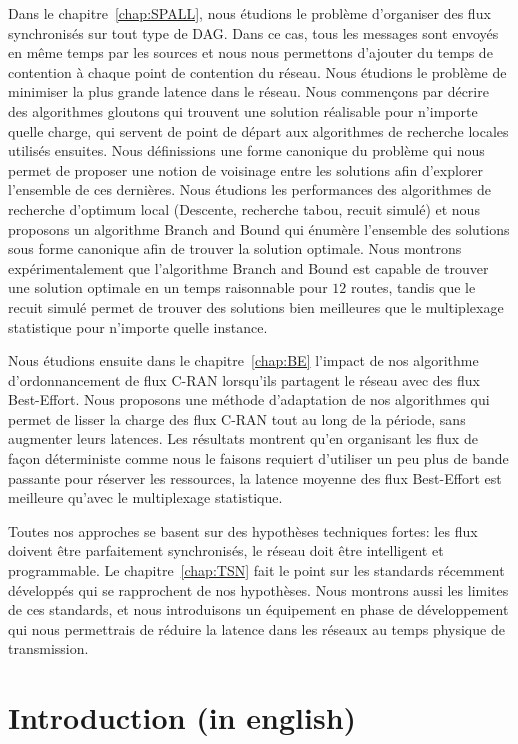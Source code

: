 Dans le chapitre~\ref{chap:SPALL}, nous étudions le problème d'organiser des flux synchronisés sur tout type de DAG. Dans ce cas, tous les messages sont envoyés en même temps par les sources et nous nous permettons d'ajouter du temps de contention à chaque point de contention du réseau. Nous étudions le problème de minimiser la plus grande latence dans le réseau. Nous commençons par décrire des algorithmes gloutons qui trouvent une solution réalisable pour n'importe quelle charge, qui servent de point de départ aux algorithmes de recherche locales utilisés ensuites. Nous définissions une forme canonique du problème qui nous permet de proposer une notion de voisinage entre les solutions afin d'explorer l'ensemble de ces dernières. Nous étudions les performances des algorithmes de recherche d'optimum local (Descente, recherche tabou, recuit simulé) et nous proposons un algorithme Branch and Bound qui énumère l'ensemble des solutions sous forme canonique afin de trouver la solution optimale. Nous montrons expérimentalement que l'algorithme Branch and Bound est capable de trouver une solution optimale en un temps raisonnable pour $12$ routes, tandis que le recuit simulé permet de trouver des solutions bien meilleures que le multiplexage statistique pour n'importe quelle instance.

Nous étudions ensuite dans le chapitre~\ref{chap:BE} l'impact de nos algorithme d'ordonnancement de flux C-RAN lorsqu'ils partagent le réseau avec des flux Best-Effort. Nous proposons une méthode d'adaptation de nos algorithmes qui permet de lisser la charge des flux C-RAN tout au long de la période, sans augmenter leurs latences. Les résultats montrent qu'en organisant les flux de façon déterministe comme nous le faisons requiert d'utiliser un peu plus de bande passante pour réserver les ressources, la latence moyenne des flux Best-Effort est meilleure qu'avec le multiplexage statistique.

Toutes nos approches se basent sur des hypothèses techniques fortes: les flux doivent être parfaitement synchronisés, le réseau doit être intelligent et programmable. Le chapitre~\ref{chap:TSN} fait le point sur les standards récemment développés qui se rapprochent de nos hypothèses. Nous montrons aussi les limites de ces standards, et nous introduisons un équipement en phase de développement qui nous permettrais de réduire la latence dans les réseaux au temps physique de transmission.




\chapter*{Introduction (in english)}
\label{chap:introen}
\minitoc


